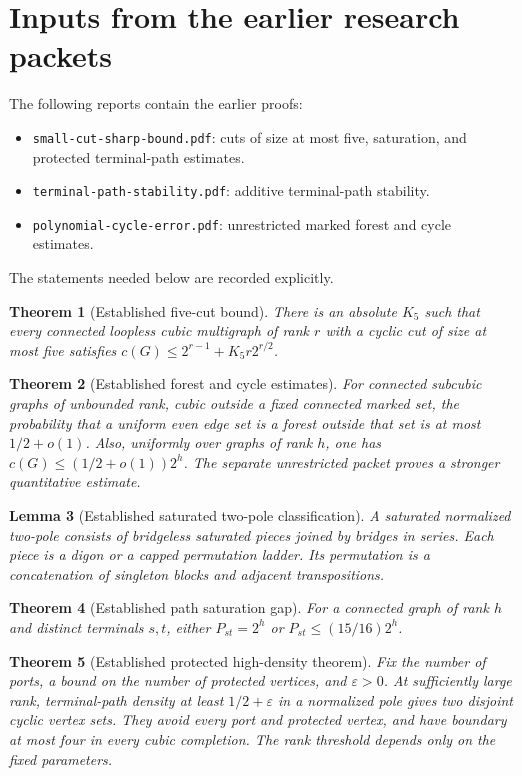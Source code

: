 \documentclass[11pt]{article}
\newtheorem{theorem}{Theorem}[section]
\newtheorem{lemma}[theorem]{Lemma}
\begin{document}
\section{Inputs from the earlier research packets}
The following reports contain the earlier proofs:
\begin{itemize}
\item \nolinkurl{small-cut-sharp-bound.pdf}: cuts of size at most five, saturation, and protected terminal-path estimates.
\item \nolinkurl{terminal-path-stability.pdf}: additive terminal-path stability.
\item \nolinkurl{polynomial-cycle-error.pdf}: unrestricted marked forest and cycle estimates.
\end{itemize}
The statements needed below are recorded explicitly.
\begin{theorem}[Established five-cut bound]\label{thm:sharp-order-five-cut-error}
There is an absolute $K_5$ such that every connected loopless cubic multigraph of rank $r$ with a cyclic cut of size at most five satisfies $c(G)\le2^{r-1}+K_5r2^{r/2}$.
\end{theorem}
\begin{theorem}[Established forest and cycle estimates]
For connected subcubic graphs of unbounded rank, cubic outside a fixed connected marked set, the probability that a uniform even edge set is a forest outside that set is at most $1/2+o(1)$.
Also, uniformly over graphs of rank $h$, one has $c(G)\le(1/2+o(1))2^h$.
The separate unrestricted packet proves a stronger quantitative estimate.
\end{theorem}
\begin{lemma}[Established saturated two-pole classification]\label{lem:full-two-pole-classification}
A saturated normalized two-pole consists of bridgeless saturated pieces joined by bridges in series.
Each piece is a digon or a capped permutation ladder.
Its permutation is a concatenation of singleton blocks and adjacent transpositions.
\end{lemma}
\begin{theorem}[Established path saturation gap]\label{thm:terminal-path-saturation-gap}
For a connected graph of rank $h$ and distinct terminals $s,t$, either $P_{st}=2^h$ or $P_{st}\le(15/16)2^h$.
\end{theorem}
\begin{theorem}[Established protected high-density theorem]\label{thm:high-density-protected-cyclic-sets}
Fix the number of ports, a bound on the number of protected vertices, and $\varepsilon>0$.
At sufficiently large rank, terminal-path density at least $1/2+\varepsilon$ in a normalized pole gives two disjoint cyclic vertex sets.
They avoid every port and protected vertex, and have boundary at most four in every cubic completion.
The rank threshold depends only on the fixed parameters.
\end{theorem}
\end{document}
